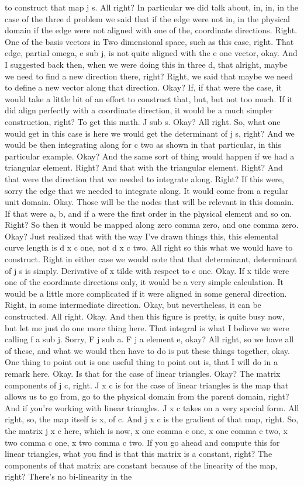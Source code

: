 \documentclass[10pt]{article}
\begin{document}
to construct that map j s. All right? In particular we did talk about, in, in, in the case of the three d problem we said that if the edge were not in, in the physical domain if the edge were not aligned with one of the, coordinate directions. Right. One of the basis vectors in Two dimensional space, such as this case, right. That edge, partial omega, e sub j, is not quite aligned with the e one vector, okay. And I suggested back then, when we were doing this in three d, that alright, maybe we need to find a new direction there, right? Right, we said that maybe we need to define a new vector along that direction. Okay? If, if that were the case, it would take a little bit of an effort to construct that, but, but not too much. If it did align perfectly with a coordinate direction, it would be a much simpler construction, right? To get this math. J sub s. Okay? All right. So, what one would get in this case is here we would get the determinant of j s, right? And we would be then integrating along for c two as shown in that particular, in this particular example. Okay? And the same sort of thing would happen if we had a triangular element. Right? And that with the triangular element. Right? And that were the direction that we needed to integrate along. Right? If this were, sorry the edge that we needed to integrate along. It would come from a regular unit domain. Okay. Those will be the nodes that will be relevant in this domain. If that were a, b, and if a were the first order in the physical element and so on. Right? So then it would be mapped along zero comma zero, and one comma zero. Okay? Just realized that with the way I've drawn things this, this elemental curve length is d x c one, not d x c two. All right so this what we would have to construct. Right in either case we would note that that determinant, determinant of j s is simply. Derivative of x tilde with respect to c one. Okay. If x tilde were one of the coordinate directions only, it would be a very simple calculation. It would be a little more complicated if it were aligned in some general direction.  Right, in some intermediate direction. Okay, but nevertheless, it can be constructed. All right. Okay. And then this figure is pretty, is quite busy now, but let me just do one more thing here. That integral is what I believe we were calling f a sub j. Sorry, F j sub a. F j a element e, okay? All right, so we have all of these, and what we would then have to do is put these things together, okay. One thing to point out is one useful thing to point out is, that I will do in a remark here. Okay. Is that for the case of linear triangles. Okay? The matrix components of j c, right. J x c is for the case of linear triangles is the map that allows us to go from, go to the physical domain from the parent domain, right? And if you're working with linear triangles. J x c takes on a very special form. All right, so, the map itself is x, of c. And j x c is the gradient of that map, right. So, the matrix j x c here, which is now, x one comma c one, x one comma c two, x two comma c one, x two comma c two. If you go ahead and compute this for linear triangles, what you find is that this matrix is a constant, right? The components of that matrix are constant because of the linearity of the map, right? There's no bi-linearity in the 
\end{document}
